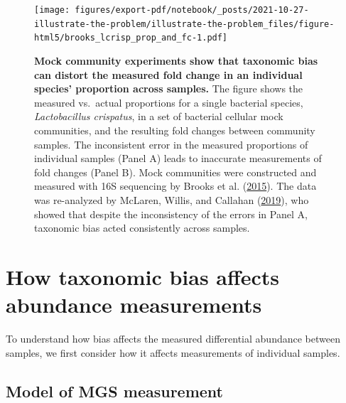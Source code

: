 \documentclass[
]{article}
\begin{document}
\begin{figure}
\centering
\texttt{[image: figures/export-pdf/notebook/\_posts/2021-10-27-illustrate-the-problem/illustrate-the-problem\_files/figure-html5/brooks\_lcrisp\_prop\_and\_fc-1.pdf]}
\caption{\label{fig:basic-problem}\textbf{Mock community experiments show that taxonomic bias can distort the measured fold change in an individual species' proportion across samples.} The figure shows the measured vs.~actual proportions for a single bacterial species, \emph{Lactobacillus crispatus}, in a set of bacterial cellular mock communities, and the resulting fold changes between community samples. The inconsistent error in the measured proportions of individual samples (Panel A) leads to inaccurate measurements of fold changes (Panel B). Mock communities were constructed and measured with 16S sequencing by Brooks et al. (\protect\hyperlink{ref-brooks2015thet}{2015}). The data was re-analyzed by McLaren, Willis, and Callahan (\protect\hyperlink{ref-mclaren2019cons}{2019}), who showed that despite the inconsistency of the errors in Panel A, taxonomic bias acted consistently across samples.}
\end{figure}



\hypertarget{abundance-measurement}{%
\section{How taxonomic bias affects abundance measurements}\label{abundance-measurement}}

To understand how bias affects the measured differential abundance between samples, we first consider how it affects measurements of individual samples.

\hypertarget{model-of-mgs-measurement}{%
\subsection{Model of MGS measurement}\label{model-of-mgs-measurement}}
\end{document}
